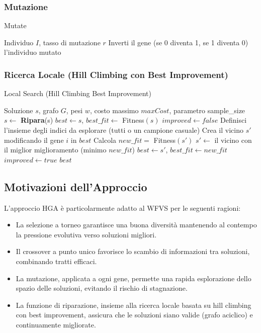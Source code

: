 \documentclass[a4paper,12pt]{article}
\begin{document}
\subsubsection{Mutazione}
\begin{algorithm}[H]
\caption{Mutate}
\begin{algorithmic}[1]
\REQUIRE Individuo $I$, tasso di mutazione $r$
        \STATE Inverti il gene (se 0 diventa 1, se 1 diventa 0)
    \ENDIF
\ENDFOR
\RETURN l'individuo mutato
\end{algorithmic}
\end{algorithm}

\subsubsection{Ricerca Locale (Hill Climbing con Best Improvement)}
\begin{algorithm}[H]
\caption{Local Search (Hill Climbing Best Improvement)}
\begin{algorithmic}[1]
\REQUIRE Soluzione $s$, grafo $G$, pesi $w$, costo massimo $maxCost$, parametro sample\_size
\STATE $s \gets$ \textbf{Ripara}(s)
\STATE $best \gets s$, $best\_fit \gets$ Fitness$(s)$
    \STATE $improved \gets false$
    \STATE Definisci l'insieme degli indici da esplorare (tutti o un campione casuale)
        \STATE Crea il vicino $s'$ modificando il gene $i$ in $best$
        \STATE Calcola $new\_fit =$ Fitness$(s')$
    \ENDFOR
    \STATE $s' \gets$ il vicino con il miglior miglioramento (minimo $new\_fit$)
        \STATE $best \gets s'$, $best\_fit \gets new\_fit$
        \STATE $improved \gets true$
    \ENDIF
\ENDWHILE
\RETURN $best$
\end{algorithmic}
\end{algorithm}

\subsection{Motivazioni dell'Approccio}
L'approccio HGA è particolarmente adatto al WFVS per le seguenti ragioni:
\begin{itemize}
    \item La selezione a torneo garantisce una buona diversità mantenendo al contempo la pressione evolutiva verso soluzioni migliori.
    \item Il crossover a punto unico favorisce lo scambio di informazioni tra soluzioni, combinando tratti efficaci.
    \item La mutazione, applicata a ogni gene, permette una rapida esplorazione dello spazio delle soluzioni, evitando il rischio di stagnazione.
    \item La funzione di riparazione, insieme alla ricerca locale basata su hill climbing con best improvement, assicura che le soluzioni siano valide (grafo aciclico) e continuamente migliorate.
\end{itemize}
\end{document}
